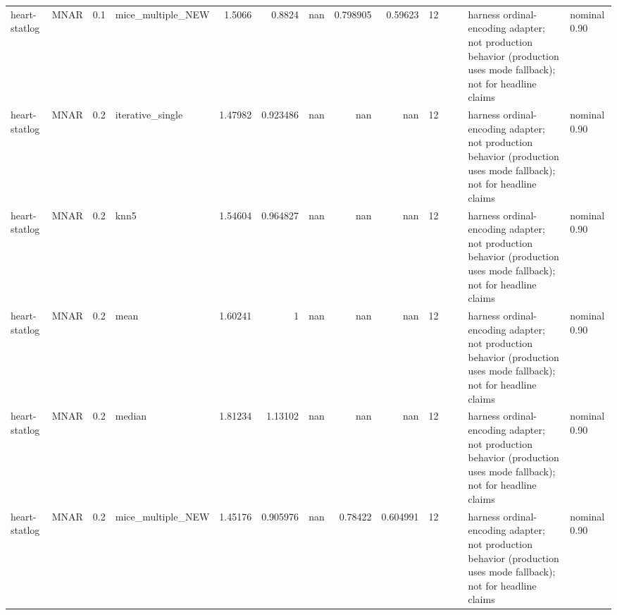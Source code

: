 \begin{table}[ht]
\begin{tabular}{llrlrrrrrrllll}
 heart-statlog        & MNAR        &         0.1 & mice\_multiple\_NEW &       1.5066   &             0.8824   &               nan        &                       0.798905 &                         0.59623  &        12 &                    &                                         & harness ordinal-encoding adapter; not production behavior (production uses mode fallback); not for headline claims & nominal 0.90              \\
 heart-statlog        & MNAR        &         0.2 & iterative\_single  &       1.47982  &             0.923486 &               nan        &                     nan        &                       nan        &        12 &                    &                                         & harness ordinal-encoding adapter; not production behavior (production uses mode fallback); not for headline claims & nominal 0.90              \\
 heart-statlog        & MNAR        &         0.2 & knn5              &       1.54604  &             0.964827 &               nan        &                     nan        &                       nan        &        12 &                    &                                         & harness ordinal-encoding adapter; not production behavior (production uses mode fallback); not for headline claims & nominal 0.90              \\
 heart-statlog        & MNAR        &         0.2 & mean              &       1.60241  &             1        &               nan        &                     nan        &                       nan        &        12 &                    &                                         & harness ordinal-encoding adapter; not production behavior (production uses mode fallback); not for headline claims & nominal 0.90              \\
 heart-statlog        & MNAR        &         0.2 & median            &       1.81234  &             1.13102  &               nan        &                     nan        &                       nan        &        12 &                    &                                         & harness ordinal-encoding adapter; not production behavior (production uses mode fallback); not for headline claims & nominal 0.90              \\
 heart-statlog        & MNAR        &         0.2 & mice\_multiple\_NEW &       1.45176  &             0.905976 &               nan        &                       0.78422  &                         0.604991 &        12 &                    &                                         & harness ordinal-encoding adapter; not production behavior (production uses mode fallback); not for headline claims & nominal 0.90              \\

\end{tabular}
\end{table}
